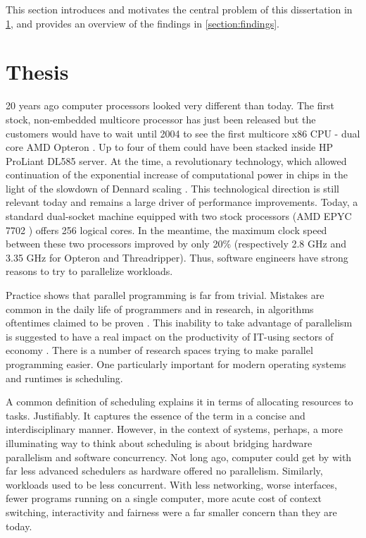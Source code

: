\documentclass[12pt,a4paper,twoside]{report}
\begin{document}
\label{firstcontentpage} %

\label{section:introduction}
This section introduces and motivates the central problem of this dissertation in \ref{section:thesis}, and provides an overview of the findings in \ref{section:findings}.  

\section{Thesis}
\label{section:thesis}
20 years ago computer processors looked very different than today. The first stock, non-embedded multicore processor has just been released \cite{POWER4Wi47:online} but the customers would have to wait until 2004 to see the first multicore x86 CPU - dual core AMD Opteron \cite{AMDAnnou13:online}. Up to four of them could have been stacked inside HP ProLiant DL585 server. At the time, a revolutionary technology, which allowed continuation of the exponential increase of computational power in chips \cite{mooremulti} in the light of the slowdown of Dennard scaling \cite{Bohr2007}. This technological direction is still relevant today and remains a large driver of performance improvements. Today, a standard dual-socket machine equipped with two stock processors (AMD EPYC 7702 \cite{2ndGenAM1:online}) offers 256 logical cores. In the meantime, the maximum clock speed between these two processors improved by only 20\% (respectively 2.8 GHz and 3.35 GHz for Opteron and Threadripper). Thus, software engineers have strong reasons to try to parallelize workloads. 

Practice shows that parallel programming is far from trivial. Mistakes are common in the daily life of programmers and in research, in algorithms oftentimes claimed to be proven \cite{Norris2013}. This inability to take advantage of parallelism is suggested to have a real impact on the productivity of IT-using sectors of economy \cite{Khan2018}. There is a number of research spaces trying to make parallel programming easier. One particularly important for modern operating systems and runtimes is scheduling. 

A common definition of scheduling explains it in terms of allocating resources to tasks. Justifiably. It captures the essence of the term in a concise and interdisciplinary manner. However, in the context of systems, perhaps, a more illuminating way to think about scheduling is about bridging hardware parallelism and software concurrency. Not long ago, computer could get by with far less advanced schedulers as hardware offered no parallelism. Similarly, workloads used to be less concurrent. With less networking, worse interfaces, fewer programs running on a single computer, more acute cost of context switching, interactivity and fairness were a far smaller concern than they are today. 
\end{document}
